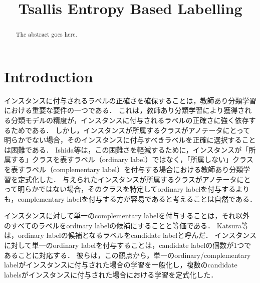 \documentclass[a4paper,conference]{IEEEtran}
\begin{document}
\title{Tsallis Entropy Based Labelling}

\author{
\and
{}
}

\maketitle

\begin{abstract}
The abstract goes here.
\end{abstract}


\IEEEpeerreviewmaketitle

\section{Introduction}
インスタンスに付与されるラベルの正確さを確保することは，教師あり分類学習における重要な要件の一つである．
これは，教師あり分類学習により獲得される分類モデルの精度が，インスタンスに付与されるラベルの正確さに強く依存するためである．
しかし，インスタンスが所属するクラスがアノテータにとって明らかでない場合，そのインスタンスに付与すべきラベルを正確に選択することは困難である．
Ishida等は，この困難さを軽減するために，インスタンスが「所属する」クラスを表すラベル（ordinary label）ではなく，「所属しない」クラスを表すラベル（complementary label）を付与する場合における教師あり分類学習を定式化した．
与えられたインスタンスが所属するクラスがアノテータにとって明らかではない場合，そのクラスを特定してordinary labelを付与するよりも，complementary labelを付与する方が容易であると考えることは自然である．

インスタンスに対して単一のcomplementary labelを付与することは，それ以外のすべてのラベルをordinary labelの候補にすることと等価である．
Katsura等は，ordinary labelの候補となるラベルをcandidate labelと呼んだ．
インスタンスに対して単一のordinary labelを付与することは，candidate labelの個数が1つであることに対応する．
彼らは，この観点から，単一のordinary/complementary labelがインスタンスに付与された場合の学習を一般化し，複数のcandidate labelsがインスタンスに付与された場合における学習を定式化した．
\end{document}
